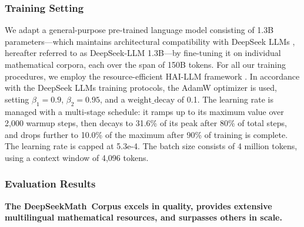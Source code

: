 \subsubsection{Training Setting}
\label{sec:quality-policy}
We adapt a general-purpose pre-trained language model consisting of 1.3B parameters—which maintains architectural compatibility with DeepSeek LLMs \citep{deepseek-llm}, hereafter referred to as DeepSeek-LLM 1.3B—by fine-tuning it on individual mathematical corpora, each over the span of 150B tokens. For all our training procedures, we employ the resource-efficient HAI-LLM framework \citep{haillm}. In accordance with the DeepSeek LLMs training protocols, the AdamW optimizer \citep{adamW} is used, setting $\beta_1=0.9$, $\beta_2=0.95$, and a $\mathrm{weight\_decay}$ of 0.1. The learning rate is managed with a multi-stage schedule: it ramps up to its maximum value over 2,000 warmup steps, then decays to 31.6\% of its peak after 80\% of total steps, and drops further to 10.0\% of the maximum after 90\% of training is complete. The learning rate is capped at 5.3e-4. The batch size consists of 4 million tokens, using a context window of 4,096 tokens.

\subsubsection{Evaluation Results}

\textbf{The DeepSeekMath~Corpus excels in quality, provides extensive multilingual mathematical resources, and surpasses others in scale.}

